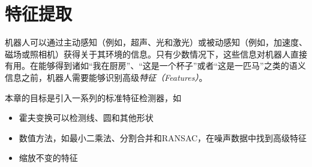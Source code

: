\chapter{特征提取}
\label{chap:feature_extraction}



机器人可以通过主动感知（例如，超声、光和激光）或被动感知（例如，加速度、磁场或照相机）获得关于其环境的信息。只有少数情况下，这些信息对机器人直接有用。在能够得到诸如“我在厨房”、“这是一个杯子”或者“这是一匹马”之类的语义信息之前，机器人需要能够识别高级\emph{特征（Features）}。

本章的目标是引入一系列的标准特征检测器，如

\begin{itemize}

\item 霍夫变换可以检测线、圆和其他形状
\item 数值方法，如最小二乘法、分割合并和RANSAC，在噪声数据中找到高级特征
\item 缩放不变的特征
\end{itemize}

